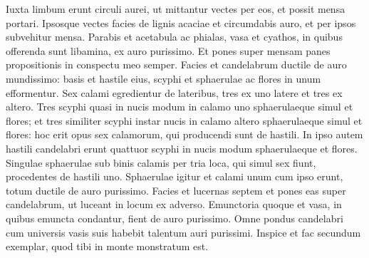 \begin{biblechapter}
\verse Iuxta limbum erunt circuli aurei, ut mittantur vectes per eos, et possit mensa portari. 
\verse Ipsosque vectes facies de lignis acaciae et circumdabis auro, et per ipsos subvehitur mensa. 
\verse Parabis et acetabula ac phialas, vasa et cyathos, in quibus offerenda sunt libamina, ex auro purissimo. 
\verse Et pones super mensam panes propositionis in conspectu meo semper. 
\verse Facies et candelabrum ductile de auro mundissimo: basis et hastile eius, scyphi et sphaerulae ac flores in unum efformentur. 
\verse Sex calami egredientur de lateribus, tres ex uno latere et tres ex altero. 
\verse Tres scyphi quasi in nucis modum in calamo uno sphaerulaeque simul et flores; et tres similiter scyphi instar nucis in calamo altero sphaerulaeque simul et flores: hoc erit opus sex calamorum, qui producendi sunt de hastili. 
\verse In ipso autem hastili candelabri erunt quattuor scyphi in nucis modum sphaerulaeque et flores. 
\verse Singulae sphaerulae sub binis calamis per tria loca, qui simul sex fiunt, procedentes de hastili uno. 
\verse Sphaerulae igitur et calami unum cum ipso erunt, totum ductile de auro purissimo. 
\verse Facies et lucernas septem et pones eas super candelabrum, ut luceant in locum ex adverso. 
\verse Emunctoria quoque et vasa, in quibus emuncta condantur, fient de auro purissimo.  
\verse Omne pondus candelabri cum universis vasis suis habebit talentum auri purissimi. 
\verse Inspice et fac secundum exemplar, quod tibi in monte monstratum est. 
\end{biblechapter}

